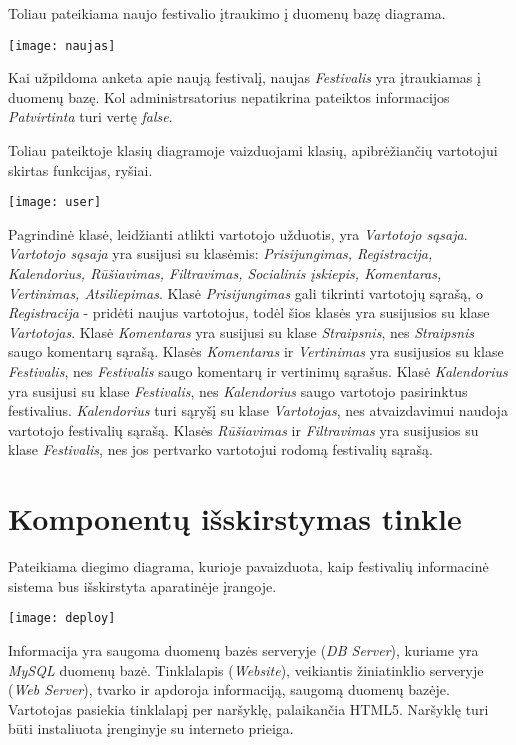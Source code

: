 ﻿\documentclass{VUMIFPSkursinis}
\begin{document}
{{Toliau pateikiama naujo festivalio įtraukimo į duomenų bazę diagrama.
\begin{center}
    \texttt{[image: naujas]}
\end{center}
Kai užpildoma anketa apie naują festivalį, naujas \textit{Festivalis} yra įtraukiamas į duomenų bazę. Kol administrsatorius nepatikrina pateiktos informacijos \textit{Patvirtinta} turi vertę \textit{false}.

Toliau pateiktoje klasių diagramoje vaizduojami klasių, apibrėžiančių vartotojui skirtas funkcijas, ryšiai.
\begin{center}
    \texttt{[image: user]}
\end{center}
Pagrindinė klasė, leidžianti atlikti vartotojo užduotis, yra \textit{Vartotojo sąsaja}. \textit{Vartotojo sąsaja} yra susijusi su klasėmis: \textit{Prisijungimas, Registracija, Kalendorius, Rūšiavimas, Filtravimas, Socialinis įskiepis, Komentaras, Vertinimas, Atsiliepimas}. Klasė \textit{Prisijungimas} gali tikrinti vartotojų sąrašą, o \textit{Registracija} - pridėti naujus vartotojus, todėl šios klasės yra susijusios su klase \textit{Vartotojas}. Klasė \textit{Komentaras} yra susijusi su klase \textit{Straipsnis}, nes \textit{Straipsnis} saugo komentarų sąrašą. Klasės \textit{Komentaras} ir \textit{Vertinimas} yra susijusios su klase \textit{Festivalis}, nes \textit{Festivalis} saugo komentarų ir vertinimų sąrašus. Klasė \textit{Kalendorius} yra susijusi su klase \textit{Festivalis}, nes \textit{Kalendorius} saugo vartotojo pasirinktus festivalius. \textit{Kalendorius} turi sąryšį su klase \textit{Vartotojas}, nes atvaizdavimui naudoja vartotojo festivalių sąrašą. Klasės \textit{Rūšiavimas} ir \textit{Filtravimas} yra susijusios su klase \textit{Festivalis}, nes jos pertvarko vartotojui rodomą festivalių sąrašą.

\section{Komponentų išskirstymas tinkle}
Pateikiama diegimo diagrama, kurioje pavaizduota, kaip festivalių informacinė sistema bus išskirstyta aparatinėje įrangoje. 
\begin{center}
    \texttt{[image: deploy]}
\end{center}
Informacija yra saugoma duomenų bazės serveryje (\textit{DB Server}), kuriame yra \textit{MySQL} duomenų bazė. Tinklalapis (\textit{Website}), veikiantis žiniatinklio serveryje (\textit{Web Server}), tvarko ir apdoroja informaciją, saugomą duomenų bazėje. Vartotojas pasiekia tinklalapį per naršyklę, palaikančia HTML5. Naršyklę turi būti instaliuota įrenginyje su interneto prieiga.


}}
\end{document}
